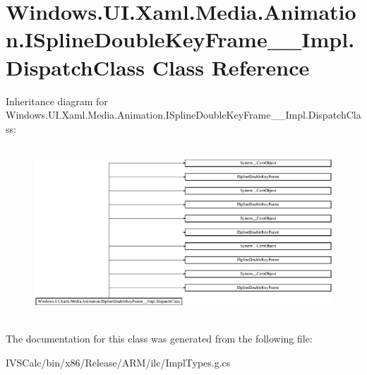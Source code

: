 \hypertarget{class_windows_1_1_u_i_1_1_xaml_1_1_media_1_1_animation_1_1_i_spline_double_key_frame_____impl_1_1_dispatch_class}{}\section{Windows.\+U\+I.\+Xaml.\+Media.\+Animation.\+I\+Spline\+Double\+Key\+Frame\+\_\+\+\_\+\+Impl.\+Dispatch\+Class Class Reference}
\label{class_windows_1_1_u_i_1_1_xaml_1_1_media_1_1_animation_1_1_i_spline_double_key_frame_____impl_1_1_dispatch_class}
Inheritance diagram for Windows.\+U\+I.\+Xaml.\+Media.\+Animation.\+I\+Spline\+Double\+Key\+Frame\+\_\+\+\_\+\+Impl.\+Dispatch\+Class\+:\begin{figure}[H]
\begin{center}
\leavevmode
\includegraphics[height=6.484210cm]{class_windows_1_1_u_i_1_1_xaml_1_1_media_1_1_animation_1_1_i_spline_double_key_frame_____impl_1_1_dispatch_class}
\end{center}
\end{figure}


The documentation for this class was generated from the following file\+:\begin{DoxyCompactItemize}
\item 
I\+V\+S\+Calc/bin/x86/\+Release/\+A\+R\+M/ilc/Impl\+Types.\+g.\+cs\end{DoxyCompactItemize}
